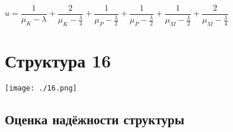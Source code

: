 \documentclass[12pt, a4paper] {ncc}
\begin{document}
			$u = \dfrac {1} {\mu_K - \lambda} + \dfrac {2} {\mu_K - \frac {\lambda}{4}} +
			 \dfrac {1} {\mu_P - \frac {\lambda} {2}} + \dfrac {1} {\mu_P - \frac {\lambda}{2}} +
			 \dfrac {1} {\mu_M - \frac {\lambda} {2}} + 
			 \dfrac {2} {\mu_M - \frac {\lambda} {4}}$





\section{Структура 16}

	\texttt{[image: ./16.png]}
    \subsection{Оценка надёжности структуры}
\end{document}

